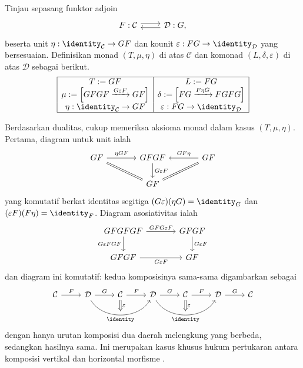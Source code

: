 \begin{example}\label{eg:adjunction-monad}
	Tinjau sepasang funktor adjoin
	\[\begin{tikzcd}
		F: \mathcal{C} \arrow[shift left, r] & \mathcal{D}: G \arrow[shift left, l],
	\end{tikzcd}\]
	beserta unit $\eta:\identity_{\mathcal{C}}\to GF$ dan kounit
	$\varepsilon:FG\to\identity_{\mathcal{D}}$ yang bersesuaian. Definisikan
	monad $(T,\mu,\eta)$ di atas $\mathcal{C}$ dan komonad
	$(L,\delta,\varepsilon)$ di atas $\mathcal{D}$ sebagai berikut.
	\[\begin{array}{|c|c|}\hline
		T := GF & L := FG \\
		\mu := \left[ GFGF \xrightarrow{G\varepsilon F} GF \right] & \delta := \left[ FG \xrightarrow{F\eta G} FGFG \right] \\
		\eta : \identity_{\mathcal{C}} \to GF & \varepsilon: FG \to \identity_{\mathcal{D}} \\ \hline
	\end{array}\]

	Berdasarkan dualitas, cukup memeriksa aksioma monad dalam kasus
	$(T,\mu,\eta)$. Pertama, diagram untuk unit ialah
	\[\begin{tikzcd}[column sep=large]
		GF \arrow[r, "{\eta GF}"] \arrow[equal, rd] & GFGF \arrow[d, "{G\varepsilon F}"] & GF \arrow[l, "{GF\eta}"'] \arrow[equal, ld] \\
		& GF &
	\end{tikzcd}\]
	yang komutatif berkat identitas segitiga
	$(G\varepsilon)(\eta G)=\identity_G$ dan
	$(\varepsilon F)(F\eta)=\identity_F$. Diagram asosiativitas ialah
	\[\begin{tikzcd}[column sep=large]
		GFGFGF \arrow[d, "{G\varepsilon FGF}"'] \arrow[r, "{GFG\varepsilon F}"] & GFGF \arrow[d, "G\varepsilon F"] \\
		GFGF \arrow[r, "G\varepsilon F"'] & GF
	\end{tikzcd}\]
	dan diagram ini komutatif: kedua komposisinya sama-sama digambarkan sebagai
	\[\begin{tikzcd}
		\mathcal{C} \arrow[r, "F"] & \mathcal{D} \arrow[r, "G"] \arrow[rr, bend right=60, ""{name=A}, "{\identity}"'] & \mathcal{C} \arrow[r, "F"] \arrow[Rightarrow, to=A, "\varepsilon"] &
		\mathcal{D} \arrow[r, "G"] \arrow[rr, bend right=60, ""{name=B}, "{\identity}"'] & \mathcal{C} \arrow[r, "F"] \arrow[Rightarrow, to=B, "\varepsilon"] & \mathcal{D} \arrow[r, "G"] & \mathcal{C}
	\end{tikzcd}\]
	dengan hanya urutan komposisi dua daerah melengkung yang berbeda, sedangkan
	hasilnya sama. Ini merupakan kasus khusus hukum pertukaran antara komposisi
	vertikal dan horizontal morfisme \cite[Lema 2.2.7]{Li1}.
\end{example}

